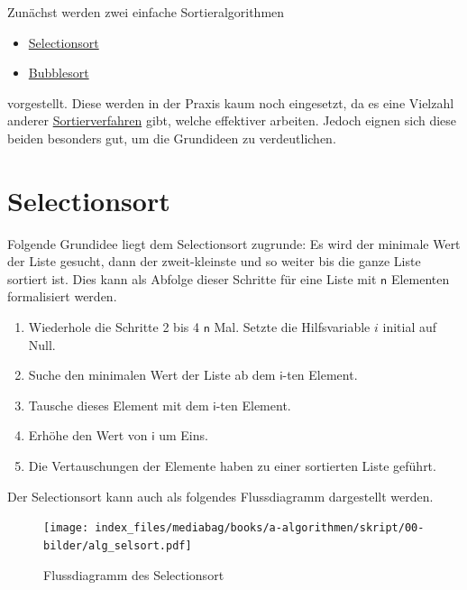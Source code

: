 \documentclass[
  letterpaper,
  DIV=11,
  numbers=noendperiod]{scrreprt}
\providecommand{\tightlist}{%
  \setlength{\itemsep}{0pt}\setlength{\parskip}{0pt}}\usepackage{longtable,booktabs,array}
\begin{document}
Zunächst werden zwei einfache Sortieralgorithmen

\begin{itemize}
\tightlist
\item
  \href{https://de.wikipedia.org/wiki/Selectionsort}{Selectionsort}
\item
  \href{https://de.wikipedia.org/wiki/Bubblesort}{Bubblesort}
\end{itemize}

vorgestellt. Diese werden in der Praxis kaum noch eingesetzt, da es eine
Vielzahl anderer
\href{https://de.wikipedia.org/wiki/Sortierverfahren}{Sortierverfahren}
gibt, welche effektiver arbeiten. Jedoch eignen sich diese beiden
besonders gut, um die Grundideen zu verdeutlichen.

\section{Selectionsort}\label{selectionsort}

Folgende Grundidee liegt dem Selectionsort zugrunde: Es wird der
minimale Wert der Liste gesucht, dann der zweit-kleinste und so weiter
bis die ganze Liste sortiert ist. Dies kann als Abfolge dieser Schritte
für eine Liste mit \(\mathsf n\) Elementen formalisiert werden.

\begin{enumerate}
\def\labelenumi{\arabic{enumi}.}
\tightlist
\item
  Wiederhole die Schritte 2 bis 4 \(\mathsf n\) Mal. Setzte die
  Hilfsvariable \(i\) initial auf Null.
\item
  Suche den minimalen Wert der Liste ab dem \(\mathsf i\)-ten Element.
\item
  Tausche dieses Element mit dem \(\mathsf i\)-ten Element.
\item
  Erhöhe den Wert von \(\mathsf i\) um Eins.
\item
  Die Vertauschungen der Elemente haben zu einer sortierten Liste
  geführt.
\end{enumerate}

Der Selectionsort kann auch als folgendes Flussdiagramm dargestellt
werden.

\begin{figure}[H]

{\centering \texttt{[image: index\_files/mediabag/books/a-algorithmen/skript/00-bilder/alg\_selsort.pdf]}

}

\caption{Flussdiagramm des Selectionsort}

\end{figure}%
\end{document}
